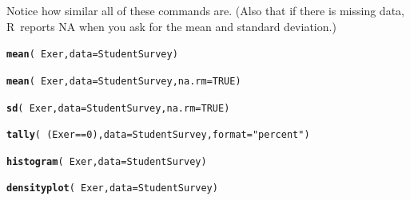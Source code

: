\documentclass[twoside]{book}\usepackage[]{graphicx}\usepackage[]{xcolor}
\makeatletter
\newcommand{\hlnum}[1]{\textcolor[rgb]{0.686,0.059,0.569}{#1}}%
\newcommand{\hlstr}[1]{\textcolor[rgb]{0.192,0.494,0.8}{#1}}%
\newcommand{\hlopt}[1]{\textcolor[rgb]{0,0,0}{#1}}%
\newcommand{\hlstd}[1]{\textcolor[rgb]{0.345,0.345,0.345}{#1}}%
\newcommand{\hlkwc}[1]{\textcolor[rgb]{0.333,0.667,0.333}{#1}}%
\newcommand{\hlkwd}[1]{\textcolor[rgb]{0.737,0.353,0.396}{\textbf{#1}}}%
\newenvironment{kframe}{%
 \def\at@end@of@kframe{}%
 \ifinner\ifhmode%
  \def\at@end@of@kframe{\end{minipage}}%
  \begin{minipage}{\columnwidth}%
 \fi\fi%
 \def\FrameCommand##1{\hskip\@totalleftmargin \hskip-\fboxsep
 \colorbox{shadecolor}{##1}\hskip-\fboxsep
     \hskip-\linewidth \hskip-\@totalleftmargin \hskip\columnwidth}%
 \MakeFramed {\advance\hsize-\width
   \@totalleftmargin\z@ \linewidth\hsize
   \@setminipage}}%
 {\par\unskip\endMakeFramed%
 \at@end@of@kframe}
\newenvironment{knitrout}{}{} %
\def\R{{\sf R}}
\makeatother
\begin{document}
\begin{solution}
Notice how similar all of these commands are.  (Also that if there is missing data, \R\ reports
NA when you ask for the mean and standard deviation.)
\begin{knitrout}
\color{fgcolor}\begin{kframe}
\begin{alltt}
\hlkwd{mean}\hlstd{(}\hlopt{~}\hlstd{Exer,} \hlkwc{data} \hlstd{= StudentSurvey)}
\end{alltt}


{\ttfamily\noindent\bfseries{}}\begin{alltt}
\hlkwd{mean}\hlstd{(}\hlopt{~}\hlstd{Exer,} \hlkwc{data} \hlstd{= StudentSurvey,} \hlkwc{na.rm} \hlstd{=} \hlnum{TRUE}\hlstd{)}
\end{alltt}


{\ttfamily\noindent\bfseries{}}\begin{alltt}
\hlkwd{sd}\hlstd{(}\hlopt{~}\hlstd{Exer,} \hlkwc{data} \hlstd{= StudentSurvey,} \hlkwc{na.rm} \hlstd{=} \hlnum{TRUE}\hlstd{)}
\end{alltt}


{\ttfamily\noindent\bfseries{}}\begin{alltt}
\hlkwd{tally}\hlstd{(}\hlopt{~}\hlstd{(Exer} \hlopt{==} \hlnum{0}\hlstd{),} \hlkwc{data} \hlstd{= StudentSurvey,} \hlkwc{format} \hlstd{=} \hlstr{"percent"}\hlstd{)}
\end{alltt}


{\ttfamily\noindent\bfseries\color{errorcolor}{\#\# Error in eval(x, envir = data, enclos = parent.frame()): object 'StudentSurvey' not found}}\begin{alltt}
\hlkwd{histogram}\hlstd{(}\hlopt{~}\hlstd{Exer,} \hlkwc{data} \hlstd{= StudentSurvey)}
\end{alltt}


{\ttfamily\noindent\bfseries\color{errorcolor}{\#\# Error in eval(substitute(groups), data, environment(formula)): object 'StudentSurvey' not found}}\begin{alltt}
\hlkwd{densityplot}\hlstd{(}\hlopt{~}\hlstd{Exer,} \hlkwc{data} \hlstd{= StudentSurvey)}
\end{alltt}



\end{kframe}
\end{knitrout}
\end{solution}
\end{document}
